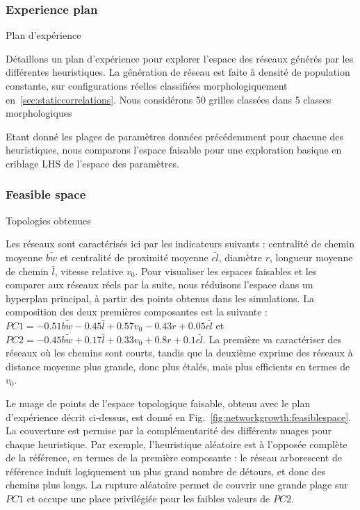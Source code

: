 \subsubsection{Experience plan}{Plan d'expérience}


Détaillons un plan d'expérience pour explorer l'espace des réseaux générés par les différentes heuristiques. La génération de réseau est faite à densité de population constante, sur configurations réelles classifiées morphologiquement en~\ref{sec:staticcorrelations}. Nous considérons 50 grilles classées dans 5 classes morphologiques


Etant donné les plages de paramètres données précédemment pour chacune des heuristiques, nous comparons l'espace faisable pour une exploration basique en criblage LHS de l'espace des paramètres.

\subsubsection{Feasible space}{Topologies obtenues}

Les réseaux sont caractérisés ici par les indicateurs suivants : centralité de chemin moyenne $\bar{bw}$ et centralité de proximité moyenne $\bar{cl}$, diamètre $r$, longueur moyenne de chemin $\bar{l}$, vitesse relative $v_0$. Pour visualiser les espaces faisables et les comparer aux réseaux réels par la suite, nous réduisons l'espace dans un hyperplan principal, à partir des points obtenus dans les simulations. La composition des deux premières composantes est la suivante : $PC1 = - 0.51 \bar{bw} - 0.45 \bar{l} + 0.57 v_0 - 0.43 r + 0.05 \bar{cl}$ et $PC2 = -0.45 \bar{bw} + 0.17 \bar{l} +0.33 v_0 + 0.8 r +0.1 \bar{cl}$. La première va caractériser des réseaux où les chemins sont courts, tandis que la deuxième exprime des réseaux à distance moyenne plus grande, donc plus étalés, mais plus efficients en termes de $v_0$. 

 
Le nuage de points de l'espace topologique faisable, obtenu avec le plan d'expérience décrit ci-dessus, est donné en Fig.~\ref{fig:networkgrowth:feasiblespace}. La couverture est permise par la complémentarité des différents nuages pour chaque heuristique. Par exemple, l'heuristique aléatoire est à l'opposée complète de la référence, en termes de la première composante : le réseau arborescent de référence induit logiquement un plus grand nombre de détours, et donc des chemins plus longs. La rupture aléatoire permet de couvrir une grande plage sur $PC1$ et occupe une place privilégiée pour les faibles valeurs de $PC2$.


